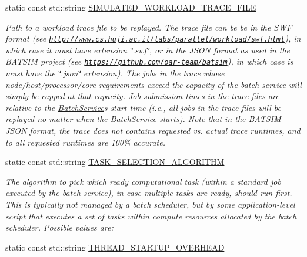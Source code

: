 \begin{DoxyCompactItemize}
static const std\+::string \hyperlink{classwrench_1_1_batch_service_property_a6a7fb4d9f505cc29f7236ea3e5713f34}{S\+I\+M\+U\+L\+A\+T\+E\+D\+\_\+\+W\+O\+R\+K\+L\+O\+A\+D\+\_\+\+T\+R\+A\+C\+E\+\_\+\+F\+I\+LE}
\begin{DoxyCompactList}\small\item\em Path to a workload trace file to be replayed. The trace file can be be in the S\+WF format (see \href{http://www.cs.huji.ac.il/labs/parallel/workload/swf.html}{\tt http\+://www.\+cs.\+huji.\+ac.\+il/labs/parallel/workload/swf.\+html}), in which case it must have extension \char`\"{}.\+swf\char`\"{}, or in the J\+S\+ON format as used in the B\+A\+T\+S\+IM project (see \href{https://github.com/oar-team/batsim}{\tt https\+://github.\+com/oar-\/team/batsim}), in which case is must have the \char`\"{}.\+json\char`\"{} extension). The jobs in the trace whose node/host/processor/core requirements exceed the capacity of the batch service will simply be capped at that capacity. Job submission times in the trace files are relative to the \hyperlink{classwrench_1_1_batch_service}{Batch\+Service}\textquotesingle{}s start time (i.\+e., all jobs in the trace files will be replayed no matter when the \hyperlink{classwrench_1_1_batch_service}{Batch\+Service} starts). Note that in the B\+A\+T\+S\+IM J\+S\+ON format, the trace does not contains requested vs. actual trace runtimes, and to all requested runtimes are 100\% accurate. \end{DoxyCompactList}\item 
static const std\+::string \hyperlink{classwrench_1_1_batch_service_property_a3869070a4dcfeea63bb5f9a8518de1cc}{T\+A\+S\+K\+\_\+\+S\+E\+L\+E\+C\+T\+I\+O\+N\+\_\+\+A\+L\+G\+O\+R\+I\+T\+HM}
\begin{DoxyCompactList}\small\item\em The algorithm to pick which ready computational task (within a standard job executed by the batch service), in case multiple tasks are ready, should run first. This is typically not managed by a batch scheduler, but by some application-\/level script that executes a set of tasks within compute resources allocated by the batch scheduler. Possible values are\+: \end{DoxyCompactList}\item 
\mbox{\label{classwrench_1_1_batch_service_property_ad60a71526e251e20cbd871e5d30e5023}} 
static const std\+::string \hyperlink{classwrench_1_1_batch_service_property_ad60a71526e251e20cbd871e5d30e5023}{T\+H\+R\+E\+A\+D\+\_\+\+S\+T\+A\+R\+T\+U\+P\+\_\+\+O\+V\+E\+R\+H\+E\+AD}

\end{DoxyCompactItemize}
